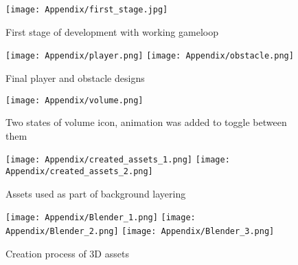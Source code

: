 \documentclass[oneside,a4paper,11pt]{report}
\begin{document}
\begin{figure}[!htb]
	\centering
	\texttt{[image: Appendix/first\_stage.jpg]}
	\caption{First stage of development with working gameloop}
\end{figure}

\begin{figure}[!htb]
	\centering
	\texttt{[image: Appendix/player.png]}
	\texttt{[image: Appendix/obstacle.png]}
	\caption{Final player and obstacle designs}
\end{figure}

\begin{figure}
	\centering
	\texttt{[image: Appendix/volume.png]}
	\caption{Two states of volume icon, animation was added to toggle between them}
\end{figure}

\begin{figure}
	\centering
	\texttt{[image: Appendix/created\_assets\_1.png]}
	\texttt{[image: Appendix/created\_assets\_2.png]}
	\caption{Assets used as part of background layering}
\end{figure}

\newpage

\begin{figure}
	\centering
	\texttt{[image: Appendix/Blender\_1.png]}
	\texttt{[image: Appendix/Blender\_2.png]}
	\texttt{[image: Appendix/Blender\_3.png]}
	\caption{Creation process of 3D assets}
\end{figure}
\end{document}
